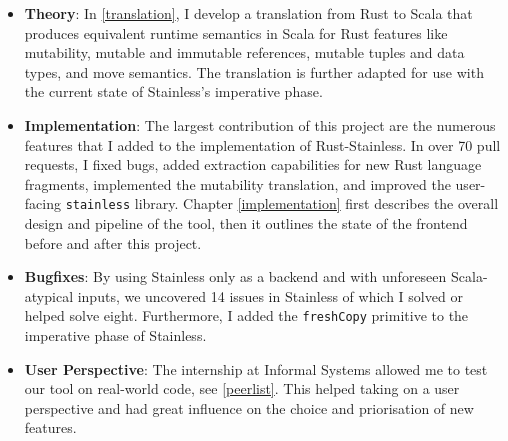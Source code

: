 \begin{itemize}

\item \textbf{Theory}: In \autoref{translation}, I develop a translation from
Rust to Scala that produces equivalent runtime semantics in Scala for Rust
features like mutability, mutable and immutable references, mutable tuples and
data types, and move semantics. The translation is further adapted for use with
the current state of Stainless's imperative phase.

\item \textbf{Implementation}: The largest contribution of this project are the
numerous features that I added  to the implementation of Rust-Stainless. In over
70 pull requests, I fixed bugs, added extraction capabilities for new Rust
language fragments, implemented the mutability translation, and improved the
user-facing \lstinline!stainless! library. Chapter \ref{implementation} first
describes the overall design and pipeline of the tool, then it outlines the
state of the frontend before and after this project.

\item \textbf{Bugfixes}: By using Stainless only as a backend and with
unforeseen Scala-atypical inputs, we uncovered 14 issues in Stainless of which I
solved or helped solve eight. Furthermore, I added the \lstinline!freshCopy!
primitive to the imperative phase of Stainless.

\item \textbf{User Perspective}: The internship at Informal Systems allowed me
to test our tool on real-world code, see \autoref{peerlist}. This helped taking
on a user perspective and had great influence on the choice and priorisation of
new features.

\end{itemize}
